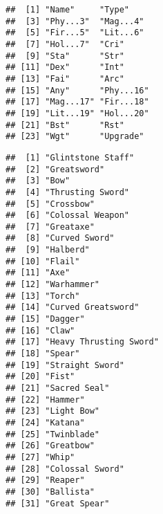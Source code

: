 \documentclass[
]{article}
\newenvironment{Shaded}{\begin{snugshade}}{\end{snugshade}}
\newcommand{\FunctionTok}[1]{\textcolor[rgb]{0.13,0.29,0.53}{\textbf{#1}}}
\newcommand{\NormalTok}[1]{#1}
\newcommand{\SpecialCharTok}[1]{\textcolor[rgb]{0.81,0.36,0.00}{\textbf{#1}}}
\begin{document}
\begin{verbatim}
##  [1] "Name"     "Type"    
##  [3] "Phy...3"  "Mag...4" 
##  [5] "Fir...5"  "Lit...6" 
##  [7] "Hol...7"  "Cri"     
##  [9] "Sta"      "Str"     
## [11] "Dex"      "Int"     
## [13] "Fai"      "Arc"     
## [15] "Any"      "Phy...16"
## [17] "Mag...17" "Fir...18"
## [19] "Lit...19" "Hol...20"
## [21] "Bst"      "Rst"     
## [23] "Wgt"      "Upgrade"
\end{verbatim}

\begin{Shaded}
\end{Shaded}

\begin{verbatim}
##  [1] "Glintstone Staff"     
##  [2] "Greatsword"           
##  [3] "Bow"                  
##  [4] "Thrusting Sword"      
##  [5] "Crossbow"             
##  [6] "Colossal Weapon"      
##  [7] "Greataxe"             
##  [8] "Curved Sword"         
##  [9] "Halberd"              
## [10] "Flail"                
## [11] "Axe"                  
## [12] "Warhammer"            
## [13] "Torch"                
## [14] "Curved Greatsword"    
## [15] "Dagger"               
## [16] "Claw"                 
## [17] "Heavy Thrusting Sword"
## [18] "Spear"                
## [19] "Straight Sword"       
## [20] "Fist"                 
## [21] "Sacred Seal"          
## [22] "Hammer"               
## [23] "Light Bow"            
## [24] "Katana"               
## [25] "Twinblade"            
## [26] "Greatbow"             
## [27] "Whip"                 
## [28] "Colossal Sword"       
## [29] "Reaper"               
## [30] "Ballista"             
## [31] "Great Spear"
\end{verbatim}
\end{document}
